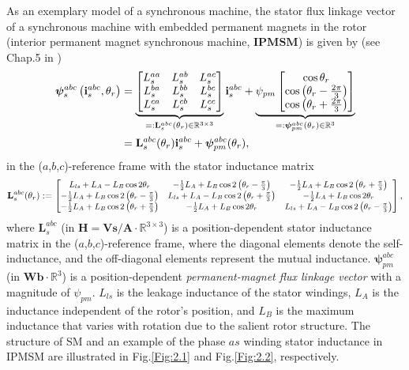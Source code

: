 As an exemplary model of a synchronous machine, the stator flux linkage vector of a synchronous machine with embedded permanent magnets in the rotor (interior permanent magnet synchronous machine, $\textbf{IPMSM}$) is given by (see Chap.5 in \cite{c2.1_1})
\begin{align}\notag
\boldsymbol{\psi}^{abc}_s\left( \mathbf{i}^{abc}_s,\theta_r\right) &= \underbrace{\begin{bmatrix}
    L^{aa}_s & L^{ab}_s & L^{ac}_s \\
    L^{ba}_s & L^{bb}_s & L^{bc}_s\\
    L^{ca}_s & L^{cb}_s & L^{cc}_s
\end{bmatrix}}_{=:\mathbf{L}^{abc}_s(\theta_r) \in \mathbb{R}^{3\times3}}\mathbf{i}^{abc}_{s} + \underbrace{\psi_{pm}\begin{bmatrix}
\cos \theta_r \\ \cos \left( \theta_r - \frac{2\pi}{3} \right) 
\\
\cos \left( \theta_r + \frac{2\pi}{3} \right)
\end{bmatrix}}_{=:\boldsymbol{\psi}^{abc}_{pm}(\theta_r)\in \mathbb{R}^{3}}\\\label{eqn:2.3}
&= \mathbf{L}^{abc}_s(\theta_r)\mathbf{i}^{abc}_{s}+\boldsymbol{\psi}^{abc}_{pm}(\theta_r),
\end{align}
in the ($a$,$b$,$c$)-reference frame with the stator inductance matrix
\begin{equation}\notag
\small
 \mathbf{L}^{abc}_s(\theta_r) := \begin{bmatrix}
L_{ls} + L_A - L_B \cos 2\theta_r & -\frac{1}{2} L_A + L_B \cos 2 \left( \theta_r - \frac{\pi}{3} \right) & -\frac{1}{2} L_A + L_B \cos 2 \left( \theta_r + \frac{\pi}{3} \right) \\
-\frac{1}{2} L_A + L_B \cos 2 \left( \theta_r - \frac{\pi}{3} \right) & L_{ls} + L_A - L_B \cos 2 \left( \theta_r + \frac{\pi}{3} \right) & -\frac{1}{2} L_A + L_B \cos 2\theta_r \\
-\frac{1}{2} L_A + L_B \cos 2 \left( \theta_r + \frac{\pi}{3} \right) & -\frac{1}{2} L_A + L_B \cos 2\theta_r & L_{ls} + L_A - L_B \cos 2 \left( \theta_r - \frac{\pi}{3} \right)
\end{bmatrix},    
\end{equation}
where $\mathbf{L}^{abc}_s$ (in $\mathbf{H=Vs/A} \cdot \mathbb{R}^{3\times3}$) is a position-dependent stator inductance matrix in the ($a$,$b$,$c$)-reference frame, where the diagonal elements denote the self-inductance, and the off-diagonal elements represent the mutual inductance. $\boldsymbol{\psi}^{abc}_{pm}$ (in $\mathbf{Wb} \cdot \mathbb{R}^{3}$) is a position-dependent \emph{permanent-magnet flux linkage vector} with a magnitude of $\psi_{pm}$. \(L_{ls}\) is the leakage inductance of the stator windings, \(L_A\) is the inductance independent of the rotor's position, and \(L_B\) is the maximum inductance that varies with rotation due to the salient rotor structure. The structure of SM and an example of the phase $as$ winding stator inductance in IPMSM are illustrated in Fig.\ref{Fig:2.1} and Fig.\ref{Fig:2.2}, respectively. 

